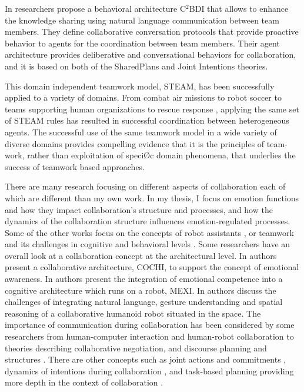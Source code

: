 \documentclass[11pt]{article}
\begin{document}
In \cite{kabil:coordination-mechanisms} researchers propose a behavioral
architecture C$^2$BDI that allows to enhance the knowledge sharing using natural
language communication between team members. They define collaborative
conversation protocols that provide proactive behavior to agents for the
coordination between team members. Their agent architecture provides
deliberative and conversational behaviors for collaboration, and it is based
on both of the SharedPlans and Joint Intentions theories.

This domain independent teamwork model, STEAM, has been successfully applied to
a variety of domains.  From combat air missions
\cite{hill:synthetic-battlefield-aircraft} to robot soccer \cite{kitano:robocup}
to teams supporting human organizations
\cite{pynadath:teamwork-heterogeneous-agents} to rescue response
\cite{scerri:robot-agent-person}, applying the same set of STEAM rules has
resulted in successful coordination between heterogeneous agents. The successful
use of the same teamwork model in a wide variety of diverse domains provides
compelling evidence that it is the principles of team- work, rather than
exploitation of speciØc domain phenomena, that underlies the success of teamwork
based approaches.

There are many research focusing
on different aspects of collaboration each of which are different than my own
work. In my thesis, I focus on emotion functions and how they impact
collaboration's structure and processes, and how the dynamics of the
collaboration structure influences emotion-regulated processes. Some of the
other works focus on the concepts of robot assistants
\cite{clancey:agent-assistants-collaboration}, or teamwork and its challenges in
cognitive and behavioral levels \cite{cohen:teamwork,
nikolaidis:collaboration-joint-action, scerri:prototype-distributed-teams,
tambe:flexible-teamwork}. Some researchers have an overall look at a
collaboration concept at the architectural level. In
\cite{garcia:collaboration-emotional-awareness} authors present a collaborative
architecture, COCHI, to support the concept of emotional awareness. In
\cite{esau:integrating-emotion-collaboration} authors present the integration of
emotional competence into a cognitive architecture which runs on a robot, MEXI.
In \cite{sofge:collaboration-humanoid-space} authors discuss the challenges of
integrating natural language, gesture understanding and spatial reasoning of a
collaborative humanoid robot situated in the space. The importance of
communication during collaboration has been considered by some researchers from
human-computer interaction and human-robot collaboration
\cite{clair:action-intention-collaboraiton,
matignon:verbal-nonverbal-collaboration, rich:discourse} to theories describing
collaborative negotiation, and discourse planning and structures
\cite{andriessen:disourse-planning, grosz:discourse-structure,
sidner:discourse-collaborative-negotiation}. There are other concepts such as
joint actions and commitments \cite{grosz:intention-dynamics-collaboration},
dynamics of intentions during collaboration \cite{levesque:acting-together}, and
task-based planning providing more depth in the context of collaboration
\cite{burghart:cognitive-architecture-robot, rich:cea}.
\end{document}
